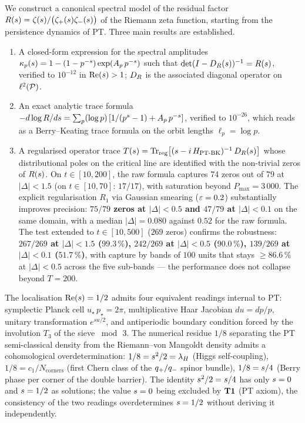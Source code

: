 We construct a canonical spectral model of the residual factor
$R(s) = \zeta(s) / \big(\zeta_{+}(s)\zeta_{-}(s)\big)$ of the Riemann
zeta function, starting from the persistence dynamics of PT. Three main
results are established.
\begin{enumerate}[nosep,leftmargin=*]
\item A closed-form expression for the spectral amplitudes
$\kappa_p(s) = 1 - (1 - p^{-s})\exp(A_p\,p^{-s})$ such that
$\det(I - D_R(s))^{-1} = R(s)$, verified to $10^{-12}$ in
$\operatorname{Re}(s) > 1$; $D_R$ is the associated diagonal operator on
$\ell^{2}(\mathcal{P})$.
\item An exact analytic trace formula
$-d \log R/ds = \sum_p (\log p)\,[1/(p^s - 1) + A_p\,p^{-s}]$, verified
to $10^{-26}$, which reads as a Berry--Keating trace formula on the orbit
lengths $\ell_p = \log p$.
\item A regularised operator trace
$T(s) = \operatorname{Tr}_{\mathrm{reg}}\!\big[(s - i\,H_{\mathrm{PT\text{-}BK}})^{-1}\,D_R(s)\big]$
whose distributional poles on the critical line are identified with the
non-trivial zeros of $R(s)$. On $t \in [10, 200]$, the raw formula
captures 74 zeros out of 79 at $|\Delta| < 1.5$ (on $t \in [10, 70]$:
$17/17$), with saturation beyond $P_{\max} = 3\,000$. The explicit
regularisation $R_1$ via Gaussian smearing ($\varepsilon = 0.2$) substantially
improves precision: \textbf{$75/79$ zeros at $|\Delta| < 0.5$ and $47/79$
at $|\Delta| < 0.1$} on the same domain, with a median $|\Delta| = 0.080$
against $0.52$ for the raw formula. The test extended to $t \in [10, 500]$
($269$ zeros) confirms the robustness: \textbf{$267/269$ at $|\Delta| < 1.5$
($99.3\,\%$), $242/269$ at $|\Delta| < 0.5$ ($90.0\,\%$), $139/269$ at
$|\Delta| < 0.1$ ($51.7\,\%$)}, with capture by bands of $100$ units that
stays $\ge 86.6\,\%$ at $|\Delta| < 0.5$ across the five sub-bands --- the
performance does not collapse beyond $T = 200$.
\end{enumerate}

The localisation $\operatorname{Re}(s) = 1/2$ admits four equivalent readings internal
to PT: symplectic Planck cell $u_\star\, p_\star = 2\pi$, multiplicative
Haar Jacobian $du = dp/p$, unitary transformation $e^{su/2}$, and
antiperiodic boundary condition forced by the involution $T_3$ of the
sieve $\bmod\,3$. The numerical residue $1/8$ separating the PT
semi-classical density from the Riemann--von Mangoldt density admits a
cohomological overdetermination: $1/8 = s^{2}/2 = \lambda_H$
(Higgs self-coupling), $1/8 = c_1/N_{\mathrm{corners}}$ (first Chern class
of the $q_{+}/q_{-}$ spinor bundle), $1/8 = s/4$ (Berry phase per
corner of the double barrier). The identity $s^{2}/2 = s/4$ has
only $s = 0$ and $s = 1/2$ as solutions; the value $s = 0$
being excluded by $\textbf{T1}$ (PT axiom), the consistency of the two readings
overdetermines $s = 1/2$ without deriving it independently.

